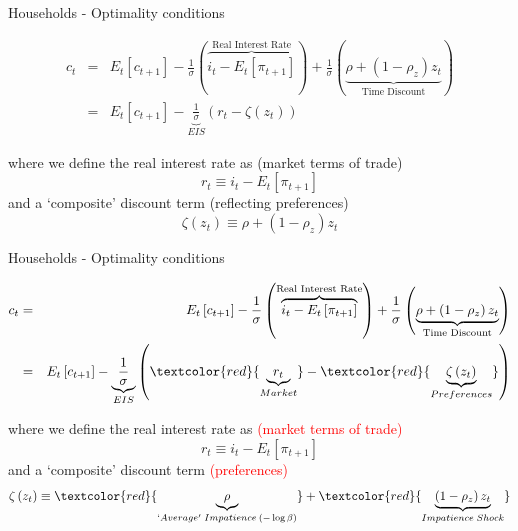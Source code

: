 \begin{frame}{Households - Optimality conditions}

\begin{eqnarray*}
c_{t} &=& E_{t} \left[ c_{t+1} \right] - \frac{1}{\sigma} \left(\overbrace{ i_{t} - E_{t}\left[ \pi_{t+1} \right] }^{\text{Real Interest Rate}} \right) + \frac{1}{\sigma} \left( \underbrace{\rho + \left( 1 - \rho_{z} \right) z_{t} }_{\text{Time Discount}} \right) \\
&=& E_{t} \left[ c_{t+1} \right] - \underbrace{\frac{1}{\sigma}}_{EIS} \left( r_{t} - \zeta\left(z_{t}\right) \right)
\end{eqnarray*}

where we define the real interest rate as (market terms of trade)
\[
r_{t}\equiv i_{t} - E_{t}\left[ \pi_{t+1} \right]
\]
and a `composite' discount term (reflecting preferences)
\[
\zeta\left(z_{t}\right) \equiv \rho + \left( 1 - \rho_{z} \right) z_{t} 
\]

\end{frame}



\begin{frame}{Households - Optimality conditions}

\begin{eqnarray*}
c_{t} &=& E_{t} \left[ c_{t+1} \right] - \frac{1}{\sigma} \left(\overbrace{ i_{t} - E_{t}\left[ \pi_{t+1} \right] }^{\text{Real Interest Rate}} \right) + \frac{1}{\sigma} \left( \underbrace{\rho + \left( 1 - \rho_{z} \right) z_{t} }_{\text{Time Discount}} \right) \\
&=& E_{t} \left[ c_{t+1} \right] - \underbrace{\frac{1}{\sigma}}_{EIS} \left( \textcolor{red}{\underbrace{r_{t}}_{Market}} - \textcolor{red}{\underbrace{\zeta\left(z_{t}\right)}_{Preferences}} \right)
\end{eqnarray*}

where we define the real interest rate as \textcolor{red}{(market terms of trade)}
\[
r_{t}\equiv i_{t} - E_{t}\left[ \pi_{t+1} \right]
\]
and a `composite' discount term \textcolor{red}{(preferences)}
\[
\zeta\left(z_{t}\right) \equiv \textcolor{red}{\underbrace{\rho}_{`Average'\;Impatience\:(-\log \beta)}} + \textcolor{red}{\underbrace{\left( 1 - \rho_{z} \right) z_{t}}_{Impatience\;Shock}}
\]

\end{frame}

